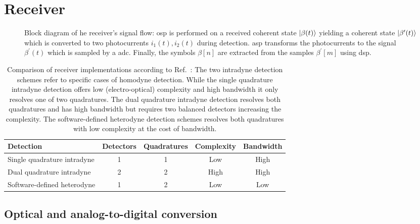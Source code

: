 \section{Receiver}


\begin{figure}[htb]
	\centering
	
	\caption{Block diagram of he receiver's signal flow: \gls{osp} is performed on a received coherent state $\ket{\beta(t)}$ yielding a coherent state $\ket{\beta^\prime(t)}$ which is converted to two photocurrents $i_1(t),i_2(t)$ during detection. \gls{asp} transforms the photocurrents to the signal $\beta^\prime(t)$ which is sampled by a \gls{adc}. Finally, the symbols $\beta[n]$ are extracted from the samples $\beta^\prime[m]$ using \gls{dsp}.}
\end{figure}

\begin{table}[htb]
  \centering
  \begin{tabular}{lcccc}
    \toprule
      Detection & Detectors & Quadratures & Complexity & Bandwidth \\
    \midrule
      Single quadrature intradyne & \num{1} & \num{1} & Low & High \\
      Dual quadrature intradyne & \num{2} & \num{2} & High & High \\
      Software-defined heterodyne & \num{1} & \num{2} & Low & Low \\
    \bottomrule
  \end{tabular}
  \caption{Comparison of receiver implementations according to Ref.~\cite{Brunner2017}: The two intradyne detection schemes refer to specific cases of homodyne detection. While the single quadrature intradyne detection offers low (electro-optical) complexity and high bandwidth it only resolves one of two quadratures. The dual quadrature intradyne detection resolves both quadratures and has high bandwidth but requires two balanced detectors increasing the complexity. The software-defined heterodyne detection schemes resolves both quadratures with low complexity at the cost of bandwidth.}
\end{table}

\subsection{Optical and analog-to-digital conversion}

